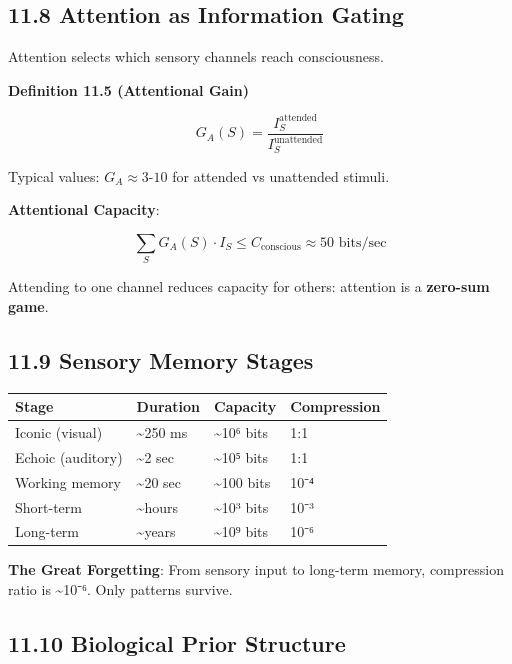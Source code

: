 \documentclass[
  11pt,
  letterpaper,
  twoside,
  openany]{book}
\makeatletter
\let\orig@subsection\subsection
\renewcommand{\subsection}{\needspace{6\baselineskip}\orig@subsection}
\makeatother
\begin{document}
\subsection{11.8 Attention as Information
Gating}\label{attention-as-information-gating}

Attention selects which sensory channels reach consciousness.

\textbf{Definition 11.5 (Attentional Gain)}

\[G_A(S) = \frac{I_S^{\text{attended}}}{I_S^{\text{unattended}}}\]

Typical values: \(G_A \approx 3\)-\(10\) for attended vs unattended
stimuli.

\textbf{Attentional Capacity}:

\[\sum_S G_A(S) \cdot I_S \leq C_{\text{conscious}} \approx 50 \text{ bits/sec}\]

Attending to one channel reduces capacity for others: attention is a
\textbf{zero-sum game}.

\subsection{11.9 Sensory Memory Stages}\label{sensory-memory-stages}

\begin{longtable}[]{@{}llll@{}}
\toprule\noalign{}
Stage & Duration & Capacity & Compression \\
\midrule\noalign{}
\endhead
\bottomrule\noalign{}
\endlastfoot
Iconic (visual) & \textasciitilde250 ms & \textasciitilde10⁶ bits &
1:1 \\
Echoic (auditory) & \textasciitilde2 sec & \textasciitilde10⁵ bits &
1:1 \\
Working memory & \textasciitilde20 sec & \textasciitilde100 bits &
10⁻⁴ \\
Short-term & \textasciitilde hours & \textasciitilde10³ bits & 10⁻³ \\
Long-term & \textasciitilde years & \textasciitilde10⁹ bits & 10⁻⁶ \\
\end{longtable}

\textbf{The Great Forgetting}: From sensory input to long-term memory,
compression ratio is \textasciitilde10⁻⁶. Only patterns survive.

\subsection{11.10 Biological Prior
Structure}\label{biological-prior-structure}
\end{document}
